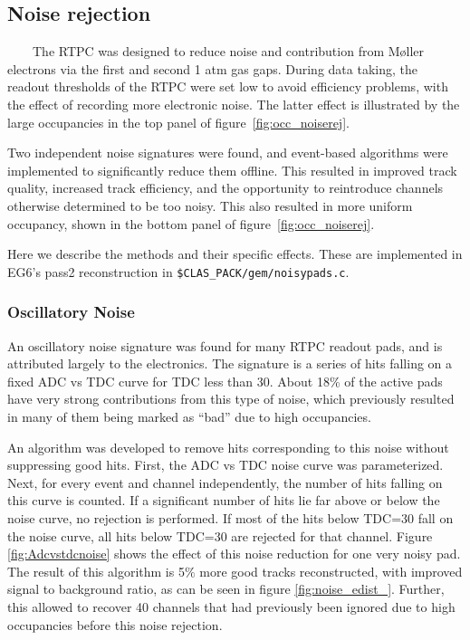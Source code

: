 \subsection{Noise rejection}
\label{sec:noise_rejection}
~~~~The RTPC was designed to reduce noise and contribution from M\o ller 
electrons via the first and second 1 atm gas gaps. During data taking, the 
readout thresholds of the RTPC were set low to avoid efficiency problems, with 
the effect of recording more electronic noise. The latter effect is illustrated 
by the large occupancies in the top panel of 
figure~\ref{fig:occ_noiserej}.  

Two independent noise signatures were found, and event-based algorithms were implemented to significantly reduce them offline. This resulted in improved track quality, increased track efficiency, and the opportunity to reintroduce channels otherwise determined to be too noisy.  This also resulted in more uniform occupancy, shown in the bottom panel of figure~\ref{fig:occ_noiserej}.  

Here we describe the methods and their specific effects. These are implemented 
in EG6's pass2 reconstruction in \texttt{\$CLAS\_PACK/gem/noisypads.c}.

\subsubsection{Oscillatory Noise}
An oscillatory noise signature was found for many RTPC readout pads, and is 
attributed largely to the electronics. The signature is a series of hits 
falling on a fixed ADC vs TDC curve for TDC less than 30.  About 18\% of the 
active pads have very strong contributions from this type of noise, which 
previously resulted in many of them being marked as ``bad'' due to high 
occupancies.

An algorithm was developed to remove hits corresponding to this noise without 
suppressing good hits.  First, the ADC vs TDC noise curve was parameterized.  
Next, for every event and channel independently, the number of hits falling on 
this curve is counted.  If a significant number of hits lie far above or below 
the noise curve, no rejection is performed.  If most of the hits below TDC=30 
fall on the noise curve, all hits below TDC=30 are rejected for that channel.  
Figure \ref{fig:Adcvstdcnoise} shows the effect of this noise reduction for one 
very noisy pad. The result of this algorithm is 5$\%$ more good tracks 
reconstructed, with improved signal to background ratio, as can be seen in 
figure \ref{fig:noise_edist_}.  Further, this allowed to recover 40 channels 
that had previously been ignored due to high occupancies before this noise 
rejection.

